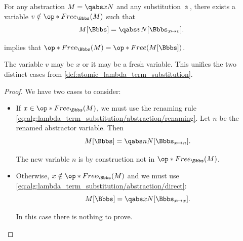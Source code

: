 \begin{proposition}\label{thm:lambda_substitution_single_rule}
  For any abstraction \( M = \qabs x N \) and any substitution \( \Bbbs \), there exists a variable \( v \notin \op*{Free}_\Bbbs(M) \) such that
  \begin{equation}\label{eq:thm:lambda_substitution_single_rule}
    M[\Bbbs] = \qabs v N[\Bbbs_{x \mapsto v}].
  \end{equation}
\end{proposition}
\begin{comments}
  \item {} implies that \( \op*{Free}_\Bbbs(M) = \op*{Free}(M[\Bbbs]) \).

  \item The variable \( v \) may be \( x \) or it may be a fresh variable. This unifies the two distinct cases from \cref{def:atomic_lambda_term_substitution}.
\end{comments}
\begin{proof}
  We have two cases to consider:
  \begin{itemize}
    \item If \( x \in \op*{Free}_\Bbbs(M) \), we must use the renaming rule \eqref{eq:alg:lambda_term_substitution/abstraction/renaming}. Let \( n \) be the renamed abstractor variable. Then
    \begin{equation*}
      M[\Bbbs] = \qabs n N[\Bbbs_{x \mapsto n}].
    \end{equation*}

    The new variable \( n \) is by construction not in \( \op*{Free}_\Bbbs(M) \).

    \item Otherwise, \( x \notin \op*{Free}_\Bbbs(M) \) and we must use \eqref{eq:alg:lambda_term_substitution/abstraction/direct}:
    \begin{equation*}
      M[\Bbbs] = \qabs x N[\Bbbs_{x \mapsto x}].
    \end{equation*}

    In this case there is nothing to prove.
  \end{itemize}
\end{proof}

